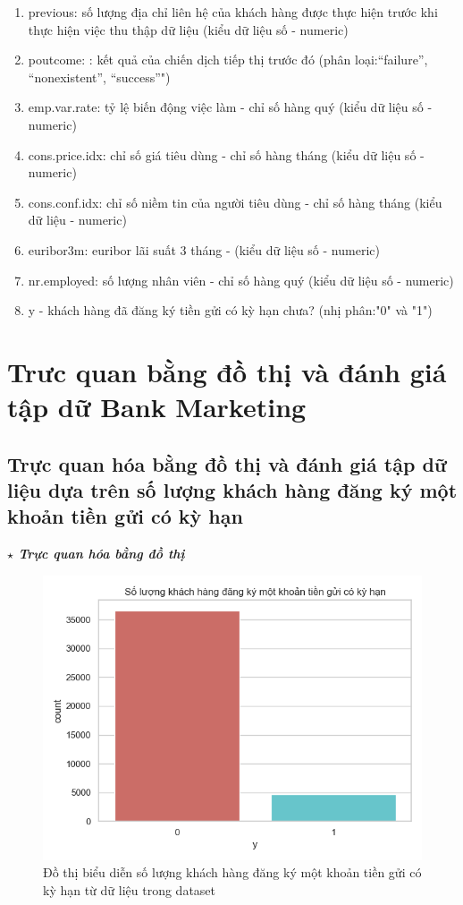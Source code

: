 \documentclass{report}
\begin{document}
\begin{enumerate}
        \item previous: số lượng địa chỉ liên hệ của khách hàng được thực hiện trước khi thực hiện việc thu thập dữ liệu (kiểu dữ liệu số - numeric)
        \item poutcome: : kết quả của chiến dịch tiếp thị trước đó (phân loại:“failure”, “nonexistent”, “success”")
        \item emp.var.rate: tỷ lệ biến động việc làm - chỉ số hàng quý (kiểu dữ liệu số - numeric)
        \item cons.price.idx: chỉ số giá tiêu dùng - chỉ số hàng tháng (kiểu dữ liệu số - numeric)     
        \item cons.conf.idx:  chỉ số niềm tin của người tiêu dùng - chỉ số hàng tháng (kiểu dữ liệu - numeric)     
        \item euribor3m: euribor lãi suất 3 tháng - (kiểu dữ liệu số - numeric)
        \item nr.employed: số lượng nhân viên - chỉ số hàng quý (kiểu dữ liệu số - numeric)
        \item y - khách hàng đã đăng ký tiền gửi có kỳ hạn chưa? (nhị phân:"0" và "1")
    \end{enumerate}

\fontsize{16}{10}\selectfont
\section{Trưc quan bằng đồ thị và đánh giá tập dữ Bank Marketing}
\subsection{Trực quan hóa bằng đồ thị và đánh giá tập dữ liệu dựa trên số lượng khách hàng đăng ký một khoản tiền gửi có kỳ hạn}
    \fontsize{13}{10}\selectfont \textbf{$\star$\textit{ Trực quan hóa bằng đồ thị}}
        \begin{figure}[htp]
            \centering
            \includegraphics[scale = 0.7]{image/count_plot.png}
            \caption{Đồ thị biểu diễn số lượng khách hàng đăng ký một khoản tiền gửi có kỳ hạn từ dữ liệu trong dataset}
        \end{figure}
        
\end{document}
